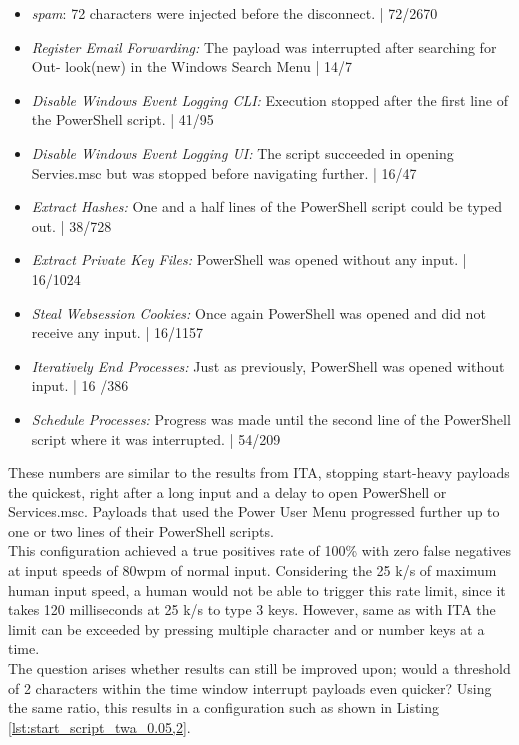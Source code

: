 \begin{itemize}
    \item  \emph{spam}: 72 characters were injected before the disconnect. | 72/2670
    \item  \emph{Register Email Forwarding:} The payload was interrupted after searching for Out-
look(new) in the Windows Search Menu | 14/7
    \item  \emph{Disable Windows Event Logging CLI:} Execution stopped after the first line of the
PowerShell script. | 41/95
    \item  \emph{Disable Windows Event Logging UI:} The script succeeded in opening Servies.msc
but was stopped before navigating further. | 16/47
    \item  \emph{Extract Hashes:}  One and a half lines of the PowerShell script could be typed out. | 38/728 
    \item  \emph{Extract Private Key Files:}  PowerShell was opened without any input. | 16/1024
    \item  \emph{Steal Websession Cookies:} Once again PowerShell was opened and did not receive any input. | 16/1157
    \item  \emph{Iteratively End Processes:} Just as previously, PowerShell was opened without input. | 16 /386
    \item  \emph{Schedule Processes:}  Progress was made until the second line of the PowerShell script where it was interrupted. | 54/209
\end{itemize}

These numbers are similar to the results from ITA, stopping start-heavy payloads the quickest, right after a long input and a delay to open PowerShell or Services.msc. Payloads that used the Power User Menu progressed further up to one or two lines of their PowerShell scripts. \\
This configuration achieved a true positives rate of 100\% with zero false negatives at input speeds of 80wpm of normal input. Considering the 25 k/s of maximum human input speed, a human would not be able to trigger this rate limit, since it takes 120 milliseconds at 25 k/s to type 3 keys. However, same as with ITA the limit can be exceeded by pressing multiple character and or number keys at a time. \\
The question arises whether results can still be improved upon; would a threshold of 2 characters within the time window interrupt payloads even quicker? Using the same ratio, this results in a configuration such as shown in Listing \ref{lst:start_script_twa_0.05,2}. 


